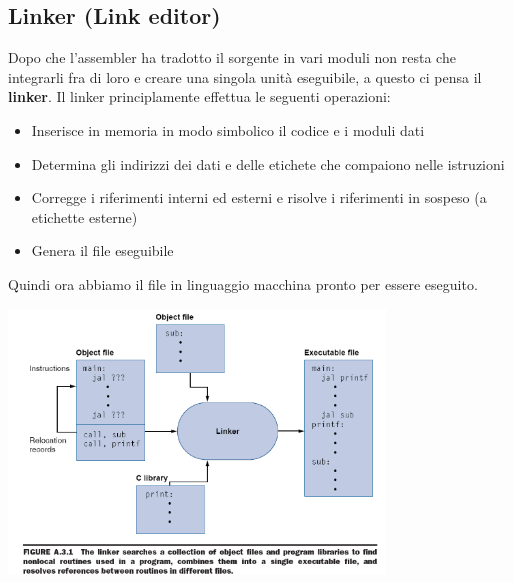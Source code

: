 \documentclass[12pt, a4paper, openany]{book}
\begin{document}
\subsection{Linker (Link editor)}
Dopo che l'assembler ha tradotto il sorgente in vari moduli non resta che integrarli
fra di loro e creare una singola unità eseguibile, a questo ci pensa il \textbf{linker}.
Il linker principlamente effettua le seguenti operazioni:\begin{itemize}
    \item Inserisce in memoria in modo simbolico il codice e i moduli dati
    \item Determina gli indirizzi dei dati e delle etichete che compaiono nelle istruzioni
    \item Corregge i riferimenti interni ed esterni e risolve i riferimenti in sospeso (a etichette esterne)
    \item Genera il file eseguibile
\end{itemize}
Quindi ora abbiamo il file in linguaggio macchina pronto per essere eseguito.
\begin{center}
    \includegraphics[width=100mm, scale=0.5]{linker.png}
\end{center}
\end{document}
